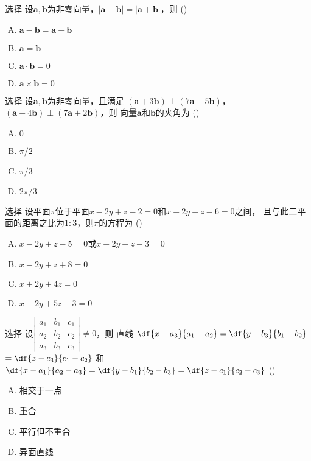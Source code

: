 \begin{frame}{选择}
	\linespread{1.3}
	设$\bm{a},\bm{b}$为非零向量，$|\bm{a}-\bm{b}|=|\bm{a}+\bm{b}|$，则
	(\underline{\;})
	\begin{enumerate}[(A)]
	  \item $\bm{a}-\bm{b}=\bm{a}+\bm{b}$
	  \item $\bm{a}=\bm{b}$
	  \item $\bm{a}\cdot\bm{b}=0$
	  \item $\bm{a}\times\bm{b}=0$
	\end{enumerate}
\end{frame}

\begin{frame}{选择}
	\linespread{1.3}
	设$\bm{a},\bm{b}$为非零向量，且满足
	$(\bm{a}+3\bm{b})\perp(7\bm{a}-5\bm{b})$，
	$(\bm{a}-4\bm{b})\perp(7\bm{a}+2\bm{b})$，则
	向量$\bm{a}$和$\bm{b}$的夹角为
	(\underline{\;})
	\begin{enumerate}[(A)]
	  \item $0$
	  \item $\pi/2$
	  \item $\pi/3$
	  \item $2\pi/3$
	\end{enumerate}
\end{frame}

\begin{frame}{选择}
	\linespread{1.3}
	设平面$\pi$位于平面$x-2y+z-2=0$和$x-2y+z-6=0$之间，
	且与此二平面的距离之比为$1:3$，则$\pi$的方程为
	(\underline{\;})
	\begin{enumerate}[(A)]
	  \item $x-2y+z-5=0$或$x-2y+z-3=0$
	  \item $x-2y+z+8=0$
	  \item $x+2y+4z=0$
	  \item $x-2y+5z-3=0$
	\end{enumerate}
\end{frame}

\begin{frame}{选择}
	\linespread{1.3}
	设$\left|\begin{array}{ccc}
	a_1 & b_1 & c_1\\ a_2 & b_2 & c_2\\ a_3 & b_3 & c_3
	\end{array}\right|\ne 0$，则
	直线
	$\df{x-a_3}{a_1-a_2}=\df{y-b_3}{b_1-b_2}$
	$=\df{z-c_3}{c_1-c_2}$
	和
	$\df{x-a_1}{a_2-a_3}=\df{y-b_1}{b_2-b_3}=\df{z-c_1}{c_2-c_3}$
	(\underline{\;})
	\begin{enumerate}[(A)]
	  \item 相交于一点
	  \item 重合
	  \item 平行但不重合
	  \item 异面直线
	\end{enumerate}
\end{frame}

